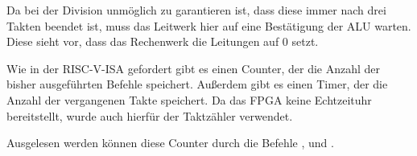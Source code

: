 Da bei der Division unm\"oglich zu garantieren ist, dass diese immer nach drei
Takten beendet ist, muss das Leitwerk hier auf eine Best\"atigung der ALU
warten. Diese sieht vor, dass das Rechenwerk die Leitungen 
auf 0 setzt.






Wie in der RISC-V-ISA gefordert gibt es einen Counter, der die Anzahl der
bisher ausgef\"uhrten Befehle speichert. Au\ss{}erdem gibt es einen Timer, der
die Anzahl der vergangenen Takte speichert. Da das FPGA keine Echtzeituhr
bereitstellt, wurde auch hierf\"ur der Taktz\"ahler verwendet.

Ausgelesen werden k\"onnen diese Counter durch die Befehle
\nolinebreak{},  und .

